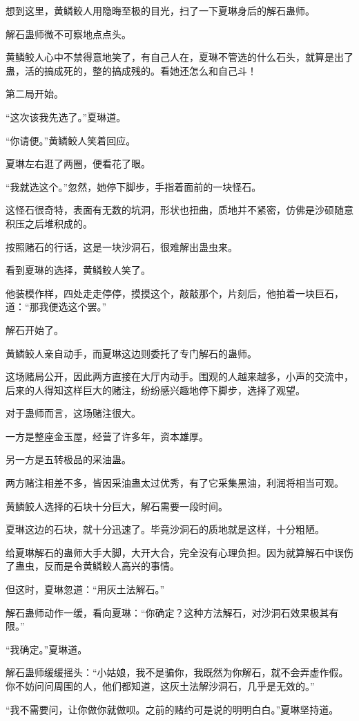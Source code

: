 \begin{this_body}
想到这里，黄鳞鲛人用隐晦至极的目光，扫了一下夏琳身后的解石蛊师。

解石蛊师微不可察地点点头。

黄鳞鲛人心中不禁得意地笑了，有自己人在，夏琳不管选的什么石头，就算是出了蛊，活的搞成死的，整的搞成残的。看她还怎么和自己斗！

第二局开始。

“这次该我先选了。”夏琳道。

“你请便。”黄鳞鲛人笑着回应。

夏琳左右逛了两圈，便看花了眼。

“我就选这个。”忽然，她停下脚步，手指着面前的一块怪石。

这怪石很奇特，表面有无数的坑洞，形状也扭曲，质地并不紧密，仿佛是沙硕随意积压之后堆积成的。

按照赌石的行话，这是一块沙洞石，很难解出蛊虫来。

看到夏琳的选择，黄鳞鲛人笑了。

他装模作样，四处走走停停，摸摸这个，敲敲那个，片刻后，他拍着一块巨石，道：“那我便选这个罢。”

解石开始了。

黄鳞鲛人亲自动手，而夏琳这边则委托了专门解石的蛊师。

这场赌局公开，因此两方直接在大厅内动手。围观的人越来越多，小声的交流中，后来的人得知这样巨大的赌注，纷纷感兴趣地停下脚步，选择了观望。

对于蛊师而言，这场赌注很大。

一方是整座金玉屋，经营了许多年，资本雄厚。

另一方是五转极品的采油蛊。

两方赌注相差不多，皆因采油蛊太过优秀，有了它采集黑油，利润将相当可观。

黄鳞鲛人选择的石块十分巨大，解石需要一段时间。

夏琳这边的石块，就十分迅速了。毕竟沙洞石的质地就是这样，十分粗陋。

给夏琳解石的蛊师大手大脚，大开大合，完全没有心理负担。因为就算解石中误伤了蛊虫，反而是令黄鳞鲛人高兴的事情。

但这时，夏琳忽道：“用灰土法解石。”

解石蛊师动作一缓，看向夏琳：“你确定？这种方法解石，对沙洞石效果极其有限。”

“我确定。”夏琳道。

解石蛊师缓缓摇头：“小姑娘，我不是骗你，我既然为你解石，就不会弄虚作假。你不妨问问周围的人，他们都知道，这灰土法解沙洞石，几乎是无效的。”

“我不需要问，让你做你就做呗。之前的赌约可是说的明明白白。”夏琳坚持道。


\end{this_body}

